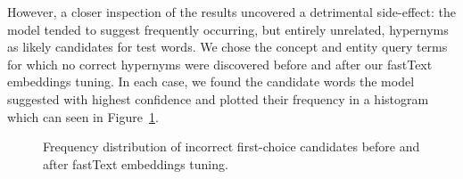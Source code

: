However, a closer inspection of the results uncovered a detrimental side-effect: the model tended to suggest frequently occurring, but entirely unrelated, hypernyms as likely candidates for test words.  We chose the concept and entity query terms for which no correct hypernyms were discovered before and after our fastText embeddings tuning.  In each case, we found the candidate words the model suggested with highest confidence and plotted their frequency in a histogram which can seen in Figure~\ref{fig:confident_bad_prediction_before_after_tuning}.
\begin{figure}[!ht]
    \centering
    \qquad
    \caption{Frequency distribution of incorrect first-choice candidates before and after fastText embeddings tuning. }
    \label{fig:confident_bad_prediction_before_after_tuning}
\end{figure}
